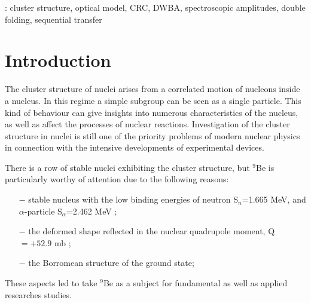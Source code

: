 \documentclass[10pt]{iopart}
\begin{document}
%
\vspace{2pc}
: cluster structure, optical model, CRC, DWBA, spectroscopic amplitudes, double folding, sequential transfer
%
%
\maketitle
%
\ioptwocol
%

\section{Introduction}
The cluster structure of nuclei arises from a correlated motion of nucleons inside a nucleus. In this regime a simple subgroup can be seen as a single particle. This kind of behaviour can give insights into numerous characteristics of the nucleus, as well as affect the processes of nuclear reactions. Investigation of the cluster structure in nuclei is still one of the priority problems of modern nuclear physics in connection with the intensive developments of experimental devices.

There is a row of stable nuclei exhibiting the cluster structure, but $^9$Be is particularly worthy of attention due to the following reasons: \begin{itemize}
\item[$-$] stable nucleus with the low binding energies of neutron S$_n$=1.665 MeV, and $\alpha$-particle S$_\alpha$=2.462 MeV \cite{separationneutron};
\item[$-$] the deformed shape reflected in the nuclear quadrupole moment, Q$=+52.9 $ mb \cite{quadrupole};
\item[$-$]  the Borromean structure of the ground state;
\end{itemize}
These aspects led to take $^9$Be as a subject for fundamental  as well as applied researches  studies.
\end{document}
